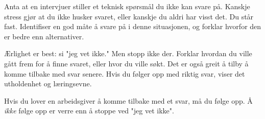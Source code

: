 

Anta at en intervjuer stiller et teknisk spørsmål du ikke kan svare på. Kanskje stress gjør at du ikke husker svaret, eller kanskje du aldri har visst det. Du står fast. Identifiser en god måte å svare på i denne situasjonen, og forklar hvorfor den er bedre enn alternativer.

\vskip 50pt







Ærlighet er best: si "jeg vet ikke." Men stopp ikke der. Forklar hvordan du ville gått frem for å finne svaret, eller hvor du ville søkt. Det er også greit å tilby å komme tilbake med svar senere. Hvis du følger opp med riktig svar, viser det utholdenhet og læringsevne.







Hvis du lover en arbeidsgiver å komme tilbake med et svar, må du følge opp. Å {\it ikke} følge opp er verre enn å stoppe ved "jeg vet ikke".


